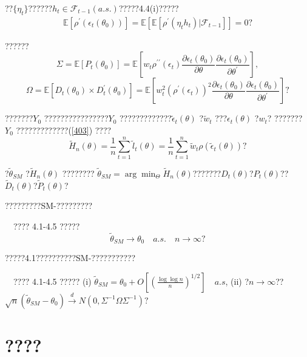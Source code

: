 \documentclass[a4paper,12pt,openany,oneside,utf-8]{ctexbook}
\newcommand{\xiaosihao}{\fontsize{12pt}{\baselineskip}\selectfont}
\begin{document}
	\noindent ??$\{\eta_t\}$??????$h_t\in \mathcal{F}_{t-1}(a.s.)$?????4.4(i)?????
	\begin{align}\label{404}
		\mathbb{E}\left[\rho^{\prime}(\epsilon_t(\theta_0))\right]=\mathbb{E}\left[\mathbb{E}\left[\rho^{\prime}(\eta_th_t)|\mathcal{F}_{t-1}\right]\right]=0\mbox{?}
	\end{align}
	
	\noindent ??????
	$$\Sigma = \mathbb{E}\left[P_t(\theta_0)\right]=\mathbb{E}\left[w_t\rho^{\prime\prime}(\epsilon_t)\frac{\partial \epsilon_{t}\left(\theta_0\right)}{\partial \theta} \frac{\partial \epsilon_{t}\left(\theta_0\right)}{\partial \theta^{\prime}}\right],$$
	$$\Omega = \mathbb{E}\left[D_t(\theta_0)\times D_t^{\prime}(\theta_0)\right]=\mathbb{E}\left[w_t^2\left(\rho^{\prime}(\epsilon_t)\right)^2\frac{\partial \epsilon_{t}\left(\theta_0\right)}{\partial \theta} \frac{\partial \epsilon_{t}\left(\theta_0\right)}{\partial \theta^{\prime}}\right]\mbox{?}$$
	
	???????$Y_0$ ????????????????$Y_0$ ?????????????$\widetilde{\epsilon}_t(\theta)$ ?$\widetilde{w}_t$ ???$\epsilon_t(\theta)$ ?$w_t$? ???????$Y_0$ ?????????????(\ref{403}) ????
	$$\widetilde{H}_{n}(\theta)=\frac{1}{n}\sum_{t=1}^n\widetilde{l}_t(\theta)=\frac{1}{n}\sum_{t=1}^n\widetilde{w}_t\rho(\widetilde{\epsilon}_t(\theta))\mbox{?}$$
	
	\noindent ?$\widetilde{\theta}_{SM}$ ?$\widetilde{H}_{n}(\theta)$ ????????
	$\widetilde{\theta}_{SM}=\arg\min_\Theta\widetilde{H}_{n}(\theta)$???????$D_t(\theta)$?$P_t(\theta)$??$\widetilde{D}_{t}(\theta)$?$\widetilde{P}_{t}(\theta)$?
	
	?????????SM-?????????
	
	\noindent{\xiaosihao\heiti ??~4.1}~~???? 4.1-4.5 ?????
	$$\widetilde{\theta}_{SM}\to\theta_0 \quad a.s. \quad n\to\infty\mbox{?}$$
	
	?????4.1??????????SM-???????????
	
	\noindent{\xiaosihao\heiti ??~4.2}~~???? 4.1-4.5 ?????
	\newline (i) $\widetilde{\theta}_{SM}=\theta_{0}+O\left[\left(\frac{\log \log n}{n}\right)^{1 / 2}\right] \quad a . s$,
	\newline (ii) ?$n\to\infty$??$\sqrt{n}(\widetilde{\theta}_{SM}-\theta_0)\stackrel{d}{\rightarrow}N\left(0,\Sigma^{-1} \Omega \Sigma^{-1}\right)\mbox{?}$
	
	\section{????}
	
\end{document}
